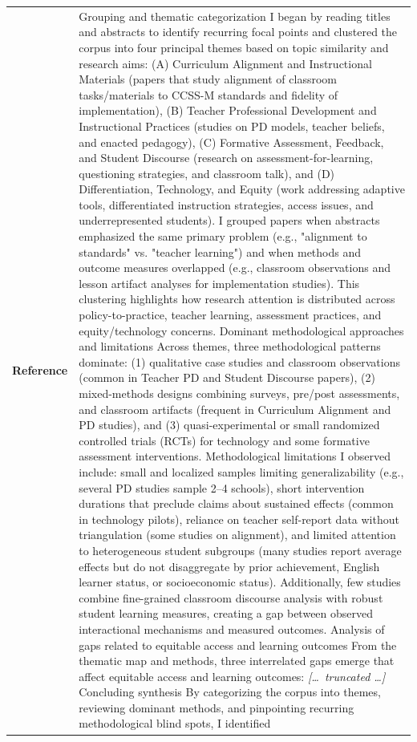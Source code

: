 \begin{longtable}{@{}l p{12.5cm}@{}}
  \textbf{Reference} & Grouping and thematic categorization \newline I began by reading titles and abstracts to identify recurring focal points and clustered the corpus into four principal themes based on topic similarity and research aims: (A) Curriculum Alignment and Instructional Materials (papers that study alignment of classroom tasks/materials to CCSS-M standards and fidelity of implementation), (B) Teacher Professional Development and Instructional Practices (studies on PD models, teacher beliefs, and enacted pedagogy), (C) Formative Assessment, Feedback, and Student Discourse (research on assessment-for-learning, questioning strategies, and classroom talk), and (D) Differentiation, Technology, and Equity (work addressing adaptive tools, differentiated instruction strategies, access issues, and underrepresented students). I grouped papers when abstracts emphasized the same primary problem (e.g., "alignment to standards" vs. "teacher learning") and when methods and outcome measures overlapped (e.g., classroom observations and lesson artifact analyses for implementation studies). This clustering highlights how research attention is distributed across policy-to-practice, teacher learning, assessment practices, and equity/technology concerns. \newline Dominant methodological approaches and limitations \newline Across themes, three methodological patterns dominate: (1) qualitative case studies and classroom observations (common in Teacher PD and Student Discourse papers), (2) mixed-methods designs combining surveys, pre/post assessments, and classroom artifacts (frequent in Curriculum Alignment and PD studies), and (3) quasi-experimental or small randomized controlled trials (RCTs) for technology and some formative assessment interventions. Methodological limitations I observed include: small and localized samples limiting generalizability (e.g., several PD studies sample 2--4 schools), short intervention durations that preclude claims about sustained effects (common in technology pilots), reliance on teacher self-report data without triangulation (some studies on alignment), and limited attention to heterogeneous student subgroups (many studies report average effects but do not disaggregate by prior achievement, English learner status, or socioeconomic status). Additionally, few studies combine fine-grained classroom discourse analysis with robust student learning measures, creating a gap between observed interactional mechanisms and measured outcomes. \newline Analysis of gaps related to equitable access and learning outcomes \newline From the thematic map and methods, three interrelated gaps emerge that affect equitable access and learning outcomes: \newline \textit{[\ldots\ truncated \ldots]} \newline Concluding synthesis \newline By categorizing the corpus into themes, reviewing dominant methods, and pinpointing recurring methodological blind spots, I identified 
\end{longtable}
